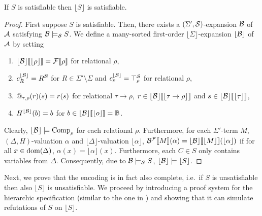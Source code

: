 \documentclass[a4paper,twoside,notitlepage,openright,11pt]{report}
\begin{document}
 \begin{proposition}
   \label{prop:folpreservesat}
   If $S$ is satisfiable then $\lfloor S\rfloor$ is satisfiable.
 \end{proposition}
 \begin{proof}
   First suppose $S$ is satisfiable. Then, there exists a $(\Sigma',\mathcal S)$-expansion $\mathcal B$ of $\mathcal A$ satisfying $\mathcal B\models_\mathcal S S$. We define a many-sorted first-order $\lfloor\Sigma\rfloor$-expansion $\lfloor\mathcal B\rfloor$ of $\mathcal A$ by %
   setting
   \begin{enumerate}[noitemsep]
   \item ${\lfloor\mathcal B\rfloor}\llbracket\lfloor\rho\rfloor\rrbracket={\mathcal F}\llbracket\rho\rrbracket$ for relational $\rho$,
   \item $c_R^{\lfloor\mathcal B\rfloor}=R^\mathcal B$ for $R\in\Sigma'\setminus\Sigma$ and $c_\rho^{\lfloor\mathcal B\rfloor}=\top_\rho^\mathcal S$ for relational $\rho$,
   \item $\operatorname{@}_{\tau,\rho}(r)(s)=r(s)$ for relational $\tau\to\rho$, $r\in{\lfloor\mathcal B\rfloor}\llbracket\lfloor\tau\to\rho\rfloor\rrbracket$ and $s\in{\lfloor\mathcal B\rfloor}\llbracket\lfloor\tau\rfloor\rrbracket$,
   \item $H^{\lfloor\mathcal B\rfloor}(b)=b$ for $b\in{\lfloor\mathcal B\rfloor}\llbracket\lfloor o\rfloor\rrbracket=\mathbb B$.
   \end{enumerate}
   Clearly, $\lfloor\mathcal B\rfloor\models\operatorname{Comp}_\rho$ for each relational $\rho$. Furthermore, for each $\Sigma'$-term $M$, $(\Delta,H)$-valuation $\alpha$ and $\lfloor\Delta\rfloor$-valuation $\lfloor\alpha\rfloor$, ${\mathcal B}^\mathcal F\llbracket M\rrbracket(\alpha)={\lfloor\mathcal B\rfloor}\llbracket\lfloor M\rfloor\rrbracket(\lfloor\alpha\rfloor)$ if for all $x\in\operatorname{dom}(\Delta)$, $\alpha(x)=\lfloor\alpha\rfloor(x)$. Furthermore, each $C\in S$ only contains variables from $\Delta$. Consequently, due to $\mathcal B\models_\mathcal S S$, $\lfloor\mathcal B\rfloor\models\lfloor S\rfloor$.
 \end{proof}
 Next, we prove that the encoding is in fact also complete, i.e.\ if $S$ is unsatisfiable then also $\lfloor S\rfloor$ is unsatisfiable. We proceed by introducing a proof system for the hierarchic specification (similar to the one in \cite{BGW94}) and showing that it can simulate refutations of $S$ on $\lfloor S\rfloor$.
\end{document}
